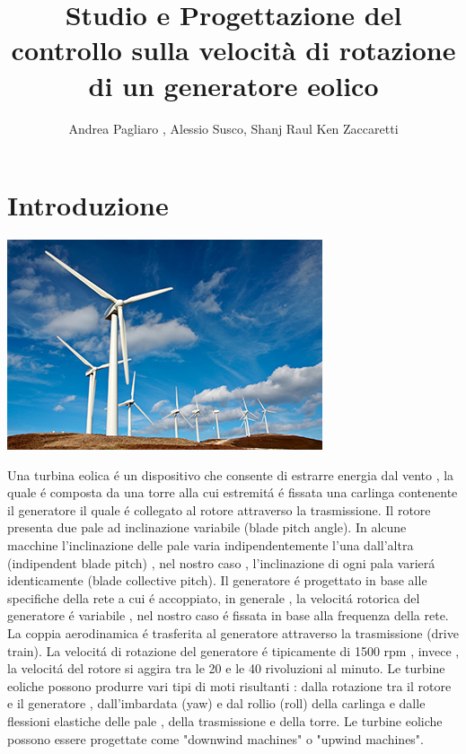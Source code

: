\documentclass[a4paper,13pt]{article}
\begin{document}
\author{Andrea Pagliaro , Alessio Susco, Shanj Raul Ken Zaccaretti}
\title{Studio e Progettazione del controllo sulla velocità di rotazione di un generatore eolico}
\maketitle
\section{Introduzione}
\begin{center}
\includegraphics[scale=0.6]{graph/paleoliche.jpg}
\end{center}
Una turbina eolica \'e un dispositivo che consente di estrarre energia dal vento , la quale \'e composta da una torre alla cui estremit\'a \'e fissata una carlinga contenente il generatore il quale \'e collegato al rotore attraverso la trasmissione.
Il rotore presenta due pale ad inclinazione variabile (blade pitch angle).
In alcune macchine l'inclinazione delle pale varia indipendentemente l'una dall'altra (indipendent blade pitch) , nel nostro caso , l'inclinazione di ogni pala varier\'a identicamente (blade collective pitch).
Il generatore \'e progettato in base alle specifiche della rete a cui \'e accoppiato, in generale , la velocit\'a rotorica del generatore \'e variabile , nel nostro caso \'e fissata in base alla frequenza della rete.
La coppia aerodinamica \'e trasferita al generatore attraverso la trasmissione (drive train).
La velocit\'a di rotazione del generatore \'e tipicamente di 1500 rpm , invece , la velocit\'a del rotore si aggira tra le 20 e le 40 rivoluzioni al minuto.
Le turbine eoliche possono produrre vari tipi di moti risultanti : dalla rotazione tra il rotore e il generatore , dall'imbardata (yaw) e dal rollio (roll) della carlinga e dalle flessioni elastiche delle pale , della trasmissione e della torre.
Le turbine eoliche possono essere progettate come "downwind machines" o "upwind machines".
\end{document}
